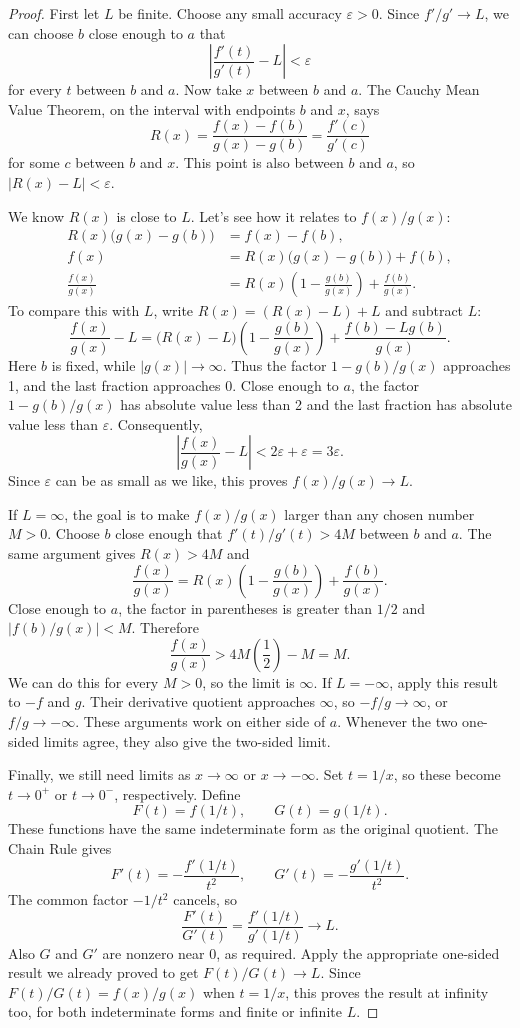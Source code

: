 \begin{proof}
First let $L$ be finite. Choose any small accuracy $\varepsilon>0$.
Since $f'/g'\to L$, we can choose $b$ close enough to $a$ that
$$\left|\frac{f'(t)}{g'(t)}-L\right|<\varepsilon$$
for every $t$ between $b$ and $a$. Now take $x$ between $b$ and $a$.
The Cauchy Mean Value Theorem, on the interval with endpoints $b$ and
$x$, says
$$R(x)=\frac{f(x)-f(b)}{g(x)-g(b)}=\frac{f'(c)}{g'(c)}$$
for some $c$ between $b$ and $x$. This point is also between $b$ and $a$,
so $|R(x)-L|<\varepsilon$.

We know $R(x)$ is close to $L$. Let's see how it relates to $f(x)/g(x)$:
\begin{align*}
R(x)\bigl(g(x)-g(b)\bigr)&=f(x)-f(b),\\
f(x)&=R(x)\bigl(g(x)-g(b)\bigr)+f(b),\\
\frac{f(x)}{g(x)}&=R(x)\left(1-\frac{g(b)}{g(x)}\right)
                         +\frac{f(b)}{g(x)}.
\end{align*}
To compare this with $L$, write $R(x)=(R(x)-L)+L$ and subtract $L$:
$$\frac{f(x)}{g(x)}-L
 =\bigl(R(x)-L\bigr)\left(1-\frac{g(b)}{g(x)}\right)
  +\frac{f(b)-Lg(b)}{g(x)}.$$
Here $b$ is fixed, while $|g(x)|\to\infty$. Thus the factor
$1-g(b)/g(x)$ approaches 1, and the last fraction approaches 0.
Close enough to $a$, the factor $1-g(b)/g(x)$ has absolute value less
than 2 and the last fraction has absolute value less than $\varepsilon$.
Consequently,
$$\left|\frac{f(x)}{g(x)}-L\right|
 <2\varepsilon+\varepsilon=3\varepsilon.$$
Since $\varepsilon$ can be as small as we like, this proves
$f(x)/g(x)\to L$.

If $L=\infty$, the goal is to make $f(x)/g(x)$ larger than any chosen
number $M>0$. Choose $b$ close enough that $f'(t)/g'(t)>4M$ between
$b$ and $a$. The same argument gives $R(x)>4M$ and
$$\frac{f(x)}{g(x)}
 =R(x)\left(1-\frac{g(b)}{g(x)}\right)+\frac{f(b)}{g(x)}.$$
Close enough to $a$, the factor in parentheses is greater than $1/2$
and $|f(b)/g(x)|<M$. Therefore
$$\frac{f(x)}{g(x)}>4M\left(\frac12\right)-M=M.$$
We can do this for every $M>0$, so the limit is $\infty$. If
$L=-\infty$, apply this result to $-f$ and $g$. Their derivative
quotient approaches $\infty$, so $-f/g\to\infty$, or $f/g\to-\infty$.
These arguments work on either side of $a$. Whenever the two one-sided
limits agree, they also give the two-sided limit.

Finally, we still need limits as $x\to\infty$ or $x\to-\infty$.
Set $t=1/x$, so these become $t\to0^+$ or $t\to0^-$, respectively.
Define
$$F(t)=f(1/t),\qquad G(t)=g(1/t).$$
These functions have the same indeterminate form as the original
quotient. The Chain Rule gives
$$F'(t)=-\frac{f'(1/t)}{t^2},\qquad
  G'(t)=-\frac{g'(1/t)}{t^2}.$$
The common factor $-1/t^2$ cancels, so
$$\frac{F'(t)}{G'(t)}=\frac{f'(1/t)}{g'(1/t)}\longrightarrow L.$$
Also $G$ and $G'$ are nonzero near 0, as required. Apply the appropriate
one-sided result we already proved to get $F(t)/G(t)\to L$. Since
$F(t)/G(t)=f(x)/g(x)$ when $t=1/x$, this proves the result at infinity
too, for both indeterminate forms and finite or infinite $L$.
\end{proof}

